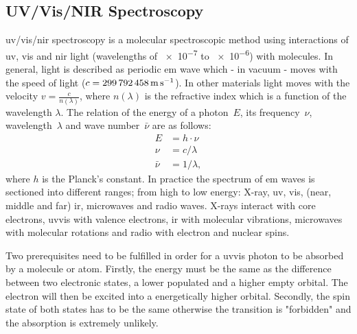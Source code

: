 \subsection{UV/Vis/NIR Spectroscopy}
\Gls{uv}/\gls{vis}/\gls{nir} spectroscopy is a molecular spectroscopic method using 
interactions of \gls{uv}, \gls{vis} and \gls{nir} light 
(wavelengths of \num{e-7} to \num{e-6}\m{}) with molecules\cite{Schwedt2008}.
In general, light is described as periodic \gls{em} wave 
which - in vacuum - moves with the speed of light ($c = \SI{299792458}{\meter\per\second}$).
In other materials light moves with the velocity $v=\frac{c}{n(\lambda)}$, where $n(\lambda)$ is the refractive index which is a function of the wavelength $\lambda$. 
The relation of the energy of a photon~$E$, its frequency~$\nu$, wavelength~$\lambda$ and wave number~$\bar{\nu}$ are as follows:
\begin{align*}
	E &= h \cdot \nu \\
	\nu &= c/ \lambda \\
	\bar{\nu} &= 1/\lambda,
\end{align*}
where $h$ is the Planck's constant.
In practice the spectrum of \gls{em} waves is sectioned into different ranges; %
from high to low energy: X-ray, \gls{uv}, \gls{vis}, (near, middle and far) \gls{ir}, microwaves and radio waves. 
X-rays interact with core electrons, \gls{uv}\gls{vis} with valence electrons, \gls{ir} with molecular vibrations, microwaves with molecular rotations and radio with electron and nuclear spins. 

Two prerequisites need to be fulfilled in order for a \gls{uv}\gls{vis} photon to be 
absorbed by a molecule or atom.
Firstly, the energy must be the same as the difference between two electronic states, a lower populated and a higher empty orbital. 
The electron will then be excited into a energetically higher orbital.
Secondly, the spin state of both states has to be the same otherwise the transition is "forbidden" and the absorption is extremely unlikely. 

